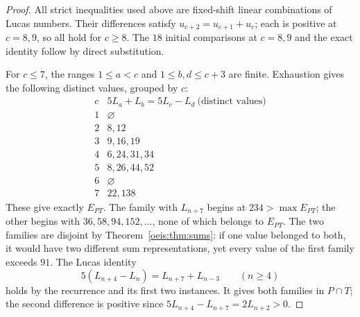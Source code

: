 \documentclass[11pt]{article}
\begin{document}
\begin{proof}
All strict inequalities used above are fixed-shift linear
combinations of Lucas numbers. Their differences satisfy
$u_{c+2}=u_{c+1}+u_c$; each is positive at $c=8,9$,
so all hold for $c\ge8$. The $18$ initial comparisons at $c=8,9$ and the exact
identity follow by direct substitution.

For $c\le7$, the ranges $1\le a<c$ and
$1\le b,d\le c+3$ are finite. Exhaustion gives the
following distinct values, grouped by $c$:
\[
\begin{array}{c|l}
c &5L_a+L_b=5L_c-L_d\ \text{(distinct values)}\\ \hline
1&\varnothing\\
2&8,12\\
3&9,16,19\\
4&6,24,31,34\\
5&8,26,44,52\\
6&\varnothing\\
7&22,138
\end{array}
\]
These give exactly $E_{PT}$. The family with $L_{n+7}$
begins at $234>\max E_{PT}$; the other begins with
$36,58,94,152,\ldots$, none of which belongs to $E_{PT}$.
The two families are disjoint by Theorem~\ref{oeis:thm:sums}:
if one value belonged to both, it would have two different
sum representations, yet every value of the first family
exceeds $91$. The Lucas identity
\[
5(L_{n+4}-L_n)=L_{n+7}+L_{n-3}\qquad(n\ge4)
\]
holds by the recurrence and its first two instances.
It gives both families in \(P\cap T\);
the second difference is positive since
\(5L_{n+4}-L_{n+7}=2L_{n+2}>0\).
\end{proof}
\end{document}
